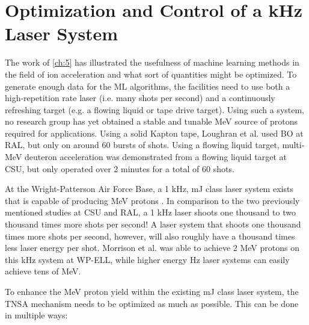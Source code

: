 \chapter{Optimization and Control of a kHz Laser System} \label{ch:6}

The work of \autoref{ch:5} has illustrated the usefulness of machine learning methods in the field of ion acceleration and what sort of quantities might be optimized. To generate enough data for the \gls{ML} algorithms, the facilities need to use both a high-repetition rate laser (i.e. many shots per second) and a continuously refreshing target (e.g. a flowing liquid or tape drive target). Using such a system, no research group has yet obtained a stable and tunable MeV source of protons required for applications. Using a solid Kapton tape, Loughran et al. \cite{Loughran_2023_HPLSE} used \gls{BO} at \gls{RAL}, but only on around 60 bursts of shots. Using a flowing liquid target, multi-MeV deuteron acceleration \cite{Treffert_2022_APL} was demonstrated from a flowing liquid target at \gls{CSU}, but only operated over 2 minutes for a total of 60 shots.

At the Wright-Patterson Air Force Base, a 1 kHz, mJ class laser system exists that is capable of producing MeV protons \cite{Morrison_2018_NJoP}. In comparison to the two previously mentioned studies at \gls{CSU} and \gls{RAL}, a 1 kHz laser shoots one thousand to two thousand times more shots per second! A laser system that shoots one thousand times more shots per second, however, will also roughly have a thousand times less laser energy per shot. Morrison et al. \cite{Morrison_2018_NJoP} was able to achieve 2 MeV protons on this kHz system at \gls{WP-ELL}, while higher energy Hz laser systems can easily achieve tens of MeV. 

To enhance the MeV proton yield within the existing mJ class laser system, the \gls{TNSA} mechanism needs to be optimized as much as possible. This can be done in multiple ways:

